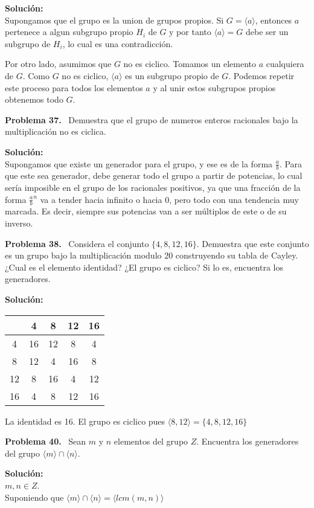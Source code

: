 \documentclass{article}
\newcounter{problem}
\newcounter{solution}
\newcommand\Problem[1]{%
  \stepcounter{problem}%
  \textbf{Problema #1.}~%
  \setcounter{solution}{0}%
}
\newcommand\TheSolution{%
  \textbf{Solución:}\\%
}
\begin{document}
\TheSolution{}
Supongamos que el grupo es la union de grupos propios. Si $G = \langle
a\rangle$, entonces $a$ pertenece a algun subgrupo propio $H_i$ de $G$ y
por tanto $\langle a \rangle = G$ debe ser un subgrupo de $H_i$, lo cual es
una contradicción.

Por otro lado, asumimos que $G$ no es ciclico. Tomamos un elemento $a$
cualquiera de $G$. Como $G$ no es ciclico, $\langle a \rangle$ es un subgrupo
propio de $G$. Podemos repetir este proceso para todos los elementos $a$ y
al unir estos subgrupos propios obtenemos todo $G$.

\Problem{37} Demuestra que el grupo de numeros enteros racionales bajo la
multiplicación no es ciclica.

\TheSolution{}
Supongamos que existe un generador para el grupo, y ese es de la forma
$\frac{a}{b}$. Para que este sea generador, debe generar todo el grupo a
partir de potencias, lo cual sería imposible en el grupo de los racionales
positivos, ya que una fracción de la forma $\frac{a}{b}^{n}$ va a tender hacia
infinito o hacia $0$, pero todo con una tendencia muy marcada. Es decir,
siempre sus potencias van a ser múltiplos de este o de su inverso. 

\Problem{38} Considera el conjunto $\{4, 8, 12, 16\}$. Demuestra que este
conjunto es un grupo bajo la multiplicación modulo 20 construyendo su tabla
de Cayley. ¿Cual es el elemento identidad? ¿El grupo es ciclico? Si lo es,
encuentra los generadores.

\TheSolution{}
\begin{center}
    	\begin{tabular}{c|cccc}
             & 4 & 8 & 12 & 16 \\ 
           \hline 
           4 & 16 & 12 & 8 & 4 \\ 
           8 & 12 & 4 & 16 & 8 \\ 
           12 & 8 & 16 & 4 & 12 \\ 
           16 & 4 & 8 & 12 & 16 \\ 
		 \end{tabular}
    \end{center}
La identidad es 16. El grupo es ciclico pues $\langle 8,12 \rangle = \{4,8,12,
16\}$

\Problem{40} Sean $m$ y $n$ elementos del grupo $Z$. Encuentra los generadores
del grupo $\langle m \rangle \cap \langle n \rangle$.

\TheSolution{}
$m,n \in Z$.\\
	Suponiendo que $\langle m \rangle \cap \langle n \rangle = \langle lcm(m,n) \rangle$
\end{document}
